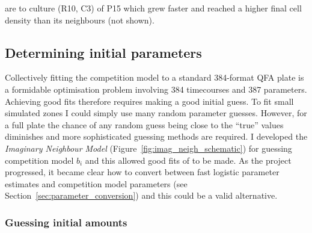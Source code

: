 \begin{Figure}
{    are to culture (R10, C3) of P15 which grew faster and reached a
    higher final cell density than its neighbours (not shown).}
  \label{fig:correction}
\end{Figure}

\subsection{Determining initial parameters}
\label{sec:initial_guess}

Collectively fitting the competition model to a standard 384-format
QFA plate is a formidable optimisation problem involving 384
timecourses and 387 parameters. Achieving good fits therefore requires
making a good initial guess. To fit small simulated zones I could
simply use many random parameter guesses. However, for a full plate
the chance of any random guess being close to the ``true'' values
diminishes and more sophisticated guessing methods are required. I
developed the \textit{Imaginary Neighbour Model}
(Figure~\ref{fig:imag_neigh_schematic}) for guessing competition model
\(b_{i}\) and this allowed good fits of to be made. As the project
progressed, it became clear how to convert between fast logistic
parameter estimates and competition model parameters (see
Section~\ref{sec:parameter_conversion}) and this could be a valid
alternative.

\subsubsection{Guessing initial amounts}
\label{sec:guessing_amounts}

